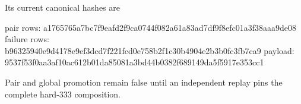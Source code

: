 Its current canonical hashes are

\begin{CodeBlock}
pair rows:    a1765765a7bc7f9eafd2f9ca0744f082a61a83ad7df9f8efc01a3f38aaa9de08
failure rows: b96325940e9d4178e9ef3dcd7f221fcd0e758b2f1c30b4904e2b3b0fc3fb7ca9
payload:      9537f53f0aa3af10ac612b01da85081a3bd44b0382f689149da5f5917e353cc1
\end{CodeBlock}

Pair and global promotion remain false until an independent replay pins
the complete hard-333 composition.
